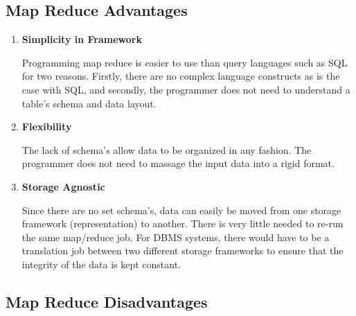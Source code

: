\documentclass[10pt,twocolumn]{IEEEtran11}
\begin{document}
\subsection{Map Reduce Advantages}

\begin {enumerate}
	\setlength\itemsep{1em}
	\item 
	
	\textbf{Simplicity in Framework}
	
	Programming map reduce is easier to use than query languages such as SQL for two reasons.  Firstly, there are no complex language constructs as is the case with SQL, and secondly, the programmer does not need to understand a table's schema and data layout.
	\item 
	
	\textbf{Flexibility}
	
	The lack of schema's allow data to be organized in any fashion.  The programmer does not need to massage the input data into a rigid format.
	
	\item 
	
	\textbf{Storage Agnostic}
	
	Since there are no set schema's, data can easily be moved from one storage framework (representation) to another.  There is very little needed to re-run the same map/reduce job.  
	For DBMS systems, there would have to be a translation job between two different storage frameworks to ensure that the integrity of the data is kept constant.
	
\end {enumerate}

\subsection{Map Reduce Disadvantages}
\end{document}

